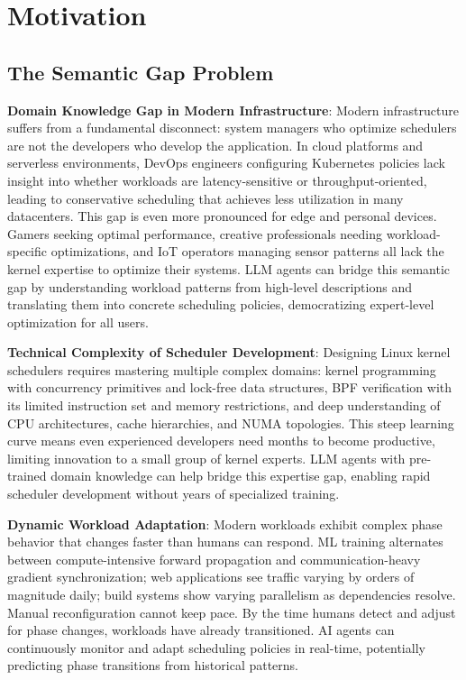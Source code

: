 \section{Motivation}
\label{sec:motivation}

\subsection{The Semantic Gap Problem}

\textbf{Domain Knowledge Gap in Modern Infrastructure}: Modern infrastructure suffers from a fundamental disconnect: system managers who optimize schedulers are not the developers who develop the application. In cloud platforms and serverless environments, DevOps engineers configuring Kubernetes policies lack insight into whether workloads are latency-sensitive or throughput-oriented, leading to conservative scheduling that achieves less utilization in many datacenters. This gap is even more pronounced for edge and personal devices. Gamers seeking optimal performance, creative professionals needing workload-specific optimizations, and IoT operators managing sensor patterns all lack the kernel expertise to optimize their systems. LLM agents can bridge this semantic gap by understanding workload patterns from high-level descriptions and translating them into concrete scheduling policies, democratizing expert-level optimization for all users.

\textbf{Technical Complexity of Scheduler Development}: Designing Linux kernel schedulers requires mastering multiple complex domains: kernel programming with concurrency primitives and lock-free data structures, BPF verification with its limited instruction set and memory restrictions, and deep understanding of CPU architectures, cache hierarchies, and NUMA topologies. This steep learning curve means even experienced developers need months to become productive, limiting innovation to a small group of kernel experts. LLM agents with pre-trained domain knowledge can help bridge this expertise gap, enabling rapid scheduler development without years of specialized training.

\textbf{Dynamic Workload Adaptation}: Modern workloads exhibit complex phase behavior that changes faster than humans can respond. ML training alternates between compute-intensive forward propagation and communication-heavy gradient synchronization; web applications see traffic varying by orders of magnitude daily; build systems show varying parallelism as dependencies resolve. Manual reconfiguration cannot keep pace. By the time humans detect and adjust for phase changes, workloads have already transitioned. AI agents can continuously monitor and adapt scheduling policies in real-time, potentially predicting phase transitions from historical patterns.

